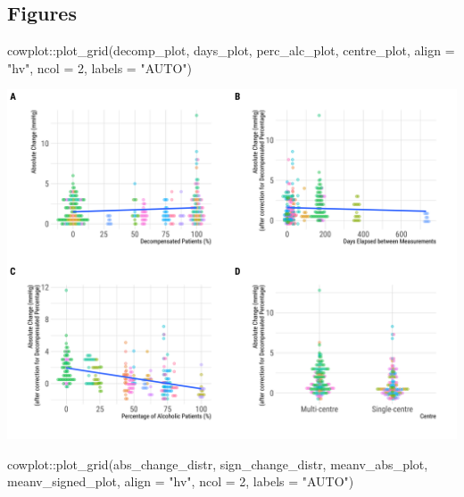 \documentclass[
]{article}
\newenvironment{Shaded}{\begin{snugshade}}{\end{snugshade}}
\newcommand{\AttributeTok}[1]{\textcolor[rgb]{0.77,0.63,0.00}{#1}}
\newcommand{\DecValTok}[1]{\textcolor[rgb]{0.00,0.00,0.81}{#1}}
\newcommand{\FunctionTok}[1]{\textcolor[rgb]{0.00,0.00,0.00}{#1}}
\newcommand{\NormalTok}[1]{#1}
\newcommand{\SpecialCharTok}[1]{\textcolor[rgb]{0.00,0.00,0.00}{#1}}
\newcommand{\StringTok}[1]{\textcolor[rgb]{0.31,0.60,0.02}{#1}}
\begin{document}
\hypertarget{figures-1}{%
\subsection{Figures}\label{figures-1}}

\begin{Shaded}
\begin{Highlighting}[]
\NormalTok{cowplot}\SpecialCharTok{::}\FunctionTok{plot\_grid}\NormalTok{(decomp\_plot, days\_plot,}
\NormalTok{                   perc\_alc\_plot, centre\_plot, }\AttributeTok{align =} \StringTok{"hv"}\NormalTok{, }
                   \AttributeTok{ncol =} \DecValTok{2}\NormalTok{, }\AttributeTok{labels =} \StringTok{"AUTO"}\NormalTok{)}
\end{Highlighting}
\end{Shaded}

\includegraphics{figures/unnamed-chunk-50-1.png}

\begin{Shaded}
\begin{Highlighting}[]
\NormalTok{cowplot}\SpecialCharTok{::}\FunctionTok{plot\_grid}\NormalTok{(abs\_change\_distr, sign\_change\_distr,}
\NormalTok{                   meanv\_abs\_plot, meanv\_signed\_plot, }
                   \AttributeTok{align =} \StringTok{"hv"}\NormalTok{, }
                   \AttributeTok{ncol =} \DecValTok{2}\NormalTok{, }\AttributeTok{labels =} \StringTok{"AUTO"}\NormalTok{)}
\end{Highlighting}
\end{Shaded}
\end{document}
